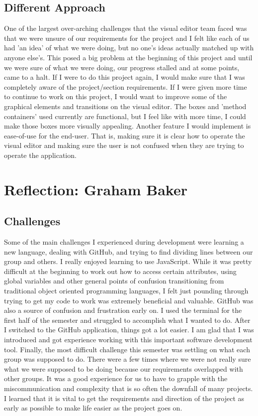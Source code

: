 \documentclass[a4paper]{article}
\begin{document}
\subsection{Different Approach}

One of the largest over-arching challenges that the visual editor team faced was that we were unsure of our requirements for the project and I felt like each of us had 'an idea' of what we were doing, but no one's ideas actually matched up with anyone else's. This posed a big problem at the beginning of this project and until we were sure of what we were doing, our progress stalled and at some points, came to a halt. If I were to do this project again, I would make sure that I was completely aware of the project/section requirements. If I were given more time to continue to work on this project, I would want to improve some of the graphical elements and transitions on the visual editor. The boxes and 'method containers' used currently are functional, but I feel like with more time, I could make those boxes more visually appealing. Another feature I would implement is ease-of-use for the end-user. That is, making sure it is clear how to operate the visual editor and making sure the user is not confused when they are trying to operate the application.


\section{Reflection: Graham Baker}
\subsection{Challenges}
Some of the main challenges I experienced during development were learning a new language, dealing with GitHub, and trying to find dividing lines between our group and others. I really enjoyed learning to use JavaScript. While it was pretty difficult at the beginning to work out how to access certain attributes, using global variables and other general points of confusion transitioning from traditional object oriented programming languages, I felt just pounding through trying to get my code to work was extremely beneficial and valuable. GitHub was also a source of confusion and frustration early on. I used the terminal for the first half of the semester and struggled to accomplish what I wanted to do. After I switched to the GitHub application, things got a lot easier. I am glad that I was introduced and got experience working with this important software development tool. Finally, the most difficult challenge this semester was settling on what each group was supposed to do. There were a few times where we were not really sure what we were supposed to be doing because our requirements overlapped with other groups. It was a good experience for us to have to grapple with the miscommunication and complexity that is so often the downfall of many projects. I learned that it is vital to get the requirements and direction of the project as early as possible to make life easier as the project goes on. 
\end{document}
